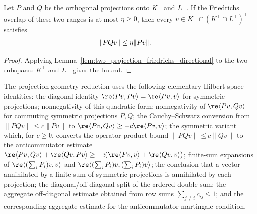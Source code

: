 \begin{lemma}
    \label{lem:two_projection_kernel_complement_compression}
    \leanok
    Let $P$ and $Q$ be the orthogonal projections onto $K^\perp$ and
    $L^\perp$. If the Friedrichs overlap of these two ranges is at most
    $\eta\ge0$, then every
    $v\in K^\perp\cap(K^\perp\cap L^\perp)^\perp$ satisfies
    \begin{align}
        \|PQv\|
         & \le\eta\|Pv\|. \notag
    \end{align}
\end{lemma}

\begin{proof}
    \leanok
    Applying Lemma~\ref{lem:two_projection_friedrichs_directional} to the two
    subspaces $K^\perp$ and $L^\perp$ gives the bound.
\end{proof}

\begin{remark}
    \label{rem:projection_geometry_rowsum_identities}
    \leanok
    The projection-geometry reduction uses the following elementary
    Hilbert-space identities: the diagonal identity
    $\re\langle Pv,Pv\rangle=\re\langle Pv,v\rangle$ for symmetric
    projections; nonnegativity of this quadratic form; nonnegativity of
    $\re\langle Pv,Qv\rangle$ for commuting symmetric projections $P,Q$; the
    Cauchy--Schwarz conversion from $\|PQv\|\le c\|Pv\|$ to
    $\re\langle Pv,Qv\rangle\ge-c\re\langle Pv,v\rangle$; the symmetric
    variant which, for $c\ge0$, converts the operator-product bound
    $\|PQv\|\le c\|Qv\|$ to the anticommutator estimate
    $\re\langle Pv,Qv\rangle+\re\langle Qv,Pv\rangle
        \ge-c(\re\langle Pv,v\rangle+\re\langle Qv,v\rangle)$;
    finite-sum expansions of
    $\re\langle(\sum_iP_i)v,v\rangle$ and
    $\re\langle(\sum_iP_i)v,(\sum_iP_i)v\rangle$; the conclusion that a
    vector annihilated by a finite sum of symmetric projections is annihilated
    by each projection; the diagonal/off-diagonal split of the ordered double
    sum; the aggregate off-diagonal estimate obtained from row sums
    $\sum_{j\ne i}c_{ij}\le1$; and the corresponding aggregate estimate for
    the anticommutator martingale condition.
\end{remark}

